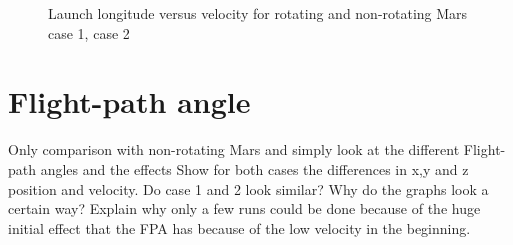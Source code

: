 \begin{figure}[H]
\centering
{} 
\caption{Launch longitude versus velocity for rotating and non-rotating Mars \protect{} case 1,  \protect{} case 2 } 
\label{fig:launchLongitudeVsVelocityCase1combined} 
\end{figure}


\section{Flight-path angle}
\label{sec:flightPathAngle}

Only comparison with non-rotating Mars and simply look at the different Flight-path angles and the effects
Show for both cases the differences in x,y and z position and velocity. Do case 1 and 2 look similar? Why do the graphs look a certain way?
Explain why only a few runs could be done because of the huge initial effect that the FPA has because of the low velocity in the beginning.

